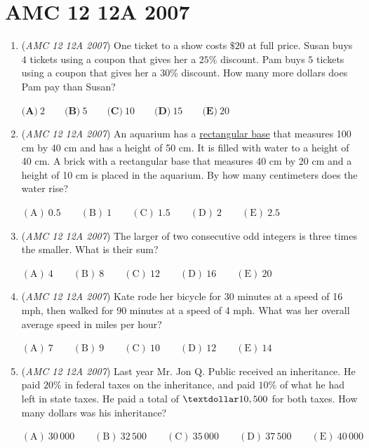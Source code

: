 \section{AMC 12 12A 2007}
        \begin{enumerate}
        	\item (\textit{AMC 12 12A 2007}) One ticket to a show costs $\$20$ at full price. Susan buys $4$ tickets using a coupon that gives her a $25\%$ discount. Pam buys $5$ tickets using a coupon that gives her a $30\%$ discount. How many more dollars does Pam pay than Susan?


 $\textbf{(A)} \ 2 \qquad \textbf{(B)} \ 5 \qquad \textbf{(C)} \ 10 \qquad \textbf{(D)} \ 15 \qquad \textbf{(E)} \ 20$


	\item (\textit{AMC 12 12A 2007}) An aquarium has a \href{https://artofproblemsolving.com/wiki/index.php?title=Rectangular\_prism}{rectangular base} that measures 100 cm by 40 cm and has a height of 50 cm. It is filled with water to a height of 40 cm. A brick with a rectangular base that measures 40 cm by 20 cm and a height of 10 cm is placed in the aquarium. By how many centimeters does the water rise?


 $\mathrm{(A)}\ 0.5\qquad \mathrm{(B)}\ 1\qquad \mathrm{(C)}\ 1.5\qquad \mathrm{(D)}\ 2\qquad \mathrm{(E)}\ 2.5$


	\item (\textit{AMC 12 12A 2007}) The larger of two consecutive odd integers is three times the smaller. What is their sum?


 $\mathrm{(A)}\ 4\qquad \mathrm{(B)}\ 8\qquad \mathrm{(C)}\ 12\qquad \mathrm{(D)}\ 16\qquad \mathrm{(E)}\ 20$


	\item (\textit{AMC 12 12A 2007}) Kate rode her bicycle for 30 minutes at a speed of 16 mph, then walked for 90 minutes at a speed of 4 mph. What was her overall average speed in miles per hour?


 $\mathrm{(A)}\ 7\qquad \mathrm{(B)}\ 9\qquad \mathrm{(C)}\ 10\qquad \mathrm{(D)}\ 12\qquad \mathrm{(E)}\ 14$


	\item (\textit{AMC 12 12A 2007}) Last year Mr. Jon Q. Public received an inheritance. He paid $20\%$ in federal taxes on the inheritance, and paid $10\%$ of what he had left in state taxes. He paid a total of $\textdollar10,500$ for both taxes. How many dollars was his inheritance?


 $(\mathrm {A})\ 30\,000 \qquad (\mathrm {B})\ 32\,500 \qquad (\mathrm {C})\ 35\,000 \qquad (\mathrm {D})\ 37\,500 \qquad (\mathrm {E})\ 40\,000$



\end{enumerate}
